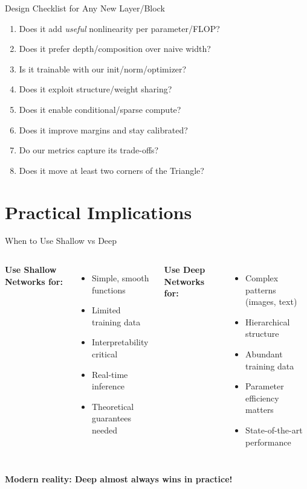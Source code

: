 \documentclass[xcolor=svgnames, 10pt, handout, standalone]{beamer}
\newcommand{\1}{\mathbf{1}}
\begin{document}
\begin{frame}{Design Checklist for Any New Layer/Block}
\begin{enumerate}
    \item<2-> Does it add \emph{useful} nonlinearity per parameter/FLOP?
    \item<3-> Does it prefer depth/composition over naive width?
    \item<4-> Is it trainable with our init/norm/optimizer?
    \item<5-> Does it exploit structure/weight sharing?
    \item<6-> Does it enable conditional/sparse compute?
    \item<7-> Does it improve margins and stay calibrated?
    \item<8-> Do our metrics capture its trade-offs?
    \item<9-> Does it move at least two corners of the Triangle?
\end{enumerate}
\end{frame}



\section{Practical Implications}

\begin{frame}{When to Use Shallow vs Deep}
\begin{columns}
\textbf{Use Shallow Networks for:}
\begin{itemize}
    \item Simple, smooth functions
    \item Limited training data
    \item Interpretability critical
    \item Real-time inference
    \item Theoretical guarantees needed
\end{itemize}

\textbf{Use Deep Networks for:}
\begin{itemize}
    \item Complex patterns (images, text)
    \item Hierarchical structure
    \item Abundant training data
    \item Parameter efficiency matters
    \item State-of-the-art performance
\end{itemize}
\end{columns}

\pause
\vspace{0.5cm}
\begin{center}
\textbf{Modern reality: Deep almost always wins in practice!}
\end{center}
\end{frame}
\end{document}
